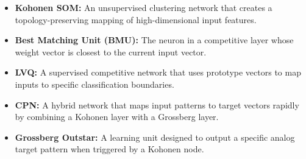 \documentclass[12pt,a4paper]{article}
\begin{document}
\begin{tcolorbox}[defbox, title={\textbf{One-Line Definitions}}]
\begin{itemize}[leftmargin=*, itemsep=2.5pt, topsep=0pt]
  \item \textbf{Kohonen SOM:} An unsupervised clustering network that creates a topology-preserving mapping of high-dimensional input features.
  \item \textbf{Best Matching Unit (BMU):} The neuron in a competitive layer whose weight vector is closest to the current input vector.
  \item \textbf{LVQ:} A supervised competitive network that uses prototype vectors to map inputs to specific classification boundaries.
  \item \textbf{CPN:} A hybrid network that maps input patterns to target vectors rapidly by combining a Kohonen layer with a Grossberg layer.
  \item \textbf{Grossberg Outstar:} A learning unit designed to output a specific analog target pattern when triggered by a Kohonen node.
\end{itemize}
\end{tcolorbox}
\end{document}
